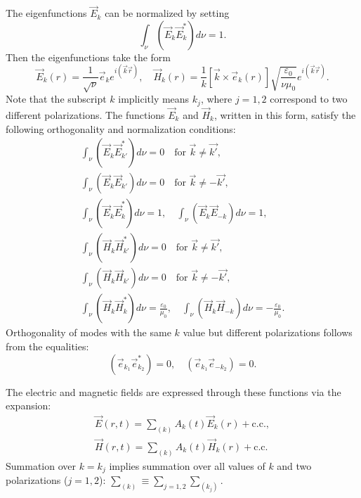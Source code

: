 The eigenfunctions $\vec{E}_k$ can be normalized by setting
\begin{equation}
\int_{\nu} \left( \vec{E}_k \vec{E}_{k}^{*} \right) d \nu = 1.
\end{equation}
Then the eigenfunctions take the form
\[
\vec{E}_k\left(r\right) = \frac{1}{\sqrt{\nu}}\vec{e}_k e^{i \left( \vec{k}\vec{r}\right)},
\quad
\vec{H}_k\left(r\right) = 
\frac{1}{k}
\left[\vec{k}\times\vec{e}_k\left(r\right)\right] 
\sqrt{\frac{\varepsilon_0}{\nu \mu_0}}
e^{i \left( \vec{k}\vec{r}\right)}.
\]
Note that the subscript $k$ implicitly means $k_j$, where $j = 1,
2$ correspond to two different polarizations.  
The functions $\vec{E}_k$ and $\vec{H}_k$, written in this form,
satisfy the following orthogonality and normalization conditions: 
\begin{eqnarray}
\int_{\nu} \left( \vec{E}_k \vec{E}_{k'}^{*} \right) d \nu = 0
\quad
\mbox{for } \vec{k} \ne \vec{k'},
\nonumber \\
\int_{\nu} \left( \vec{E}_k \vec{E}_{k'} \right) d \nu = 0
\quad
\mbox{for } \vec{k} \ne - \vec{k'},
\nonumber \\
\int_{\nu} \left( \vec{E}_k \vec{E}_{k}^{*} \right) d \nu = 1,
\quad
\int_{\nu} \left( \vec{E}_k \vec{E}_{-k} \right) d \nu = 1,
\nonumber \\
\int_{\nu} \left( \vec{H}_k \vec{H}_{k'}^{*} \right) d \nu = 0
\quad
\mbox{for } \vec{k} \ne \vec{k'},
\nonumber \\
\int_{\nu} \left( \vec{H}_k \vec{H}_{k'} \right) d \nu = 0
\quad
\mbox{for } \vec{k} \ne - \vec{k'},
\nonumber \\
\int_{\nu} \left( \vec{H}_k \vec{H}_{k}^{*} \right) d \nu = \frac{\varepsilon_0}{\mu_0},
\quad
\int_{\nu} \left( \vec{H}_k \vec{H}_{-k} \right) d \nu = - \frac{\varepsilon_0}{\mu_0}.
\label{eqCh1_task2}
\end{eqnarray}
Orthogonality of modes with the same $k$ value but different
polarizations follows from the equalities:  
\[
\left(\vec{e}_{k_1} \vec{e}_{k_2}^{*}\right) = 0, \quad
\left(\vec{e}_{k_1} \vec{e}_{- k_2}\right) = 0.
\]

The electric and magnetic fields are expressed through these functions via the expansion:
\begin{eqnarray}
\vec{E}\left(r, t\right) = 
\sum_{(k)} 
A_k\left(t\right) \vec{E}_k\left(r\right) +
\mbox{c.c.},
\nonumber \\
\vec{H}\left(r, t\right) = 
\sum_{(k)} 
A_k\left(t\right) \vec{H}_k\left(r\right) +
\mbox{c.c.}
\label{eqCh1_separation4six}
\end{eqnarray}
Summation over $k = k_j$ implies summation over all values
of $k$ and two polarizations  ($j = 1,2$): 
$\sum_{(k)} \equiv \sum_{j = 1,2} \sum_{(k_j)}$.
  
